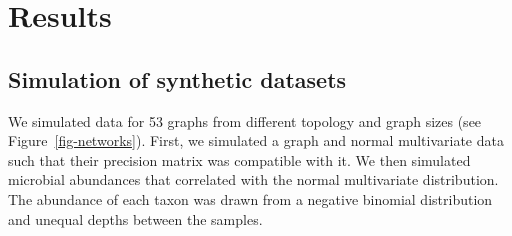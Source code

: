\documentclass[
  a4paper,
]{article}
\begin{document}
\hypertarget{results}{%
\section{Results}\label{results}}

\hypertarget{simulation-of-synthetic-datasets}{%
\subsection{Simulation of synthetic
datasets}\label{simulation-of-synthetic-datasets}}

We simulated data for 53 graphs from different topology and graph sizes
(see Figure~\ref{fig-networks}). First, we simulated a graph and normal
multivariate data such that their precision matrix was compatible with
it. We then simulated microbial abundances that correlated with the
normal multivariate distribution. The abundance of each taxon was drawn
from a negative binomial distribution and unequal depths between the
samples.
\end{document}
